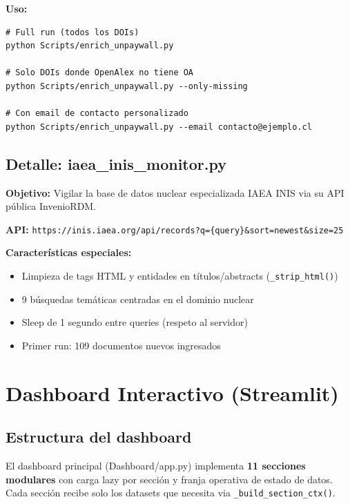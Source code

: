 \documentclass[12pt,a4paper]{report}
\newcommand{\api}[1]{{\color{cchengreen}\nolinkurl{#1}}}
\newcommand{\filebreak}{\char95\allowbreak}
\newcommand{\file}[1]{{\color{cchenblue}\ttfamily\let\_\filebreak #1}}
\begin{document}
\textbf{Uso:}
\begin{lstlisting}[style=bashstyle]
# Full run (todos los DOIs)
python Scripts/enrich_unpaywall.py

# Solo DOIs donde OpenAlex no tiene OA
python Scripts/enrich_unpaywall.py --only-missing

# Con email de contacto personalizado
python Scripts/enrich_unpaywall.py --email contacto@ejemplo.cl
\end{lstlisting}

\section{Detalle: iaea\_inis\_monitor.py}

\textbf{Objetivo:} Vigilar la base de datos nuclear especializada IAEA INIS via su API pública InvenioRDM.

\textbf{API:} \api{https://inis.iaea.org/api/records?q=\{query\}\&sort=newest\&size=25}

\textbf{Características especiales:}
\begin{itemize}
  \item Limpieza de tags HTML y entidades en títulos/abstracts (\texttt{\_strip\_html()})
  \item 9 búsquedas temáticas centradas en el dominio nuclear
  \item Sleep de 1 segundo entre queries (respeto al servidor)
  \item Primer run: 109 documentos nuevos ingresados
\end{itemize}

\chapter{Dashboard Interactivo (Streamlit)}

\section{Estructura del dashboard}

El dashboard principal (\file{Dashboard/app.py}) implementa \textbf{11 secciones modulares} con carga lazy por sección y franja operativa de estado de datos. Cada sección recibe solo los datasets que necesita via \texttt{\_build\_section\_ctx()}.
\end{document}

